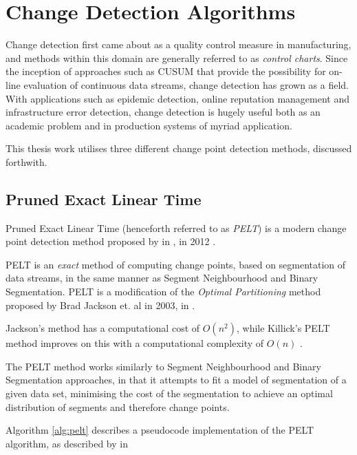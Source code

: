 \documentclass[../main.tex]{subfiles}
\begin{document}
\section{Change Detection Algorithms}

Change detection first came about as a quality control measure in manufacturing, and methods within this domain are generally referred to as \emph{control charts}. Since the inception of approaches such as CUSUM \cite{Page1954} that provide the possibility for on-line evaluation of continuous data streams, change detection has grown as a field. With applications such as epidemic detection, online reputation management and infrastructure error detection, change detection is hugely useful both as an academic problem and in production systems of myriad application.

This thesis work utilises three different change point detection methods, discussed forthwith.

\subsection{Pruned Exact Linear Time}

Pruned Exact Linear Time (henceforth referred to as \emph{PELT}) is a modern change point detection method proposed by \citeauthor{Killick2011a} in , in 2012 \cite{Killick2011a}.

PELT is an \emph{exact} method of computing change points, based on segmentation of data streams, in the same manner as Segment Neighbourhood and Binary Segmentation. PELT is a modification of the \emph{Optimal Partitioning} method proposed by Brad Jackson et. al in 2003, in \cite{Jackson2003}.

Jackson's method has a computational cost of $O(n^2)$, while Killick's PELT method improves on this with a computational complexity of $O(n)$ \cite{Killick2011a}.

The PELT method works similarly to Segment Neighbourhood \cite{Auger1989} and Binary Segmentation \cite{Jackson2003} \cite{Yao1984} approaches, in that it attempts to fit a model of segmentation of a given data set, minimising the cost of the segmentation to achieve an optimal distribution of segments and therefore change points.

Algorithm \autoref{alg:pelt} describes a pseudocode implementation of the PELT algorithm, as described by \citeauthor{Eckley2011} in  \cite{Eckley2011}\newline
\end{document}
